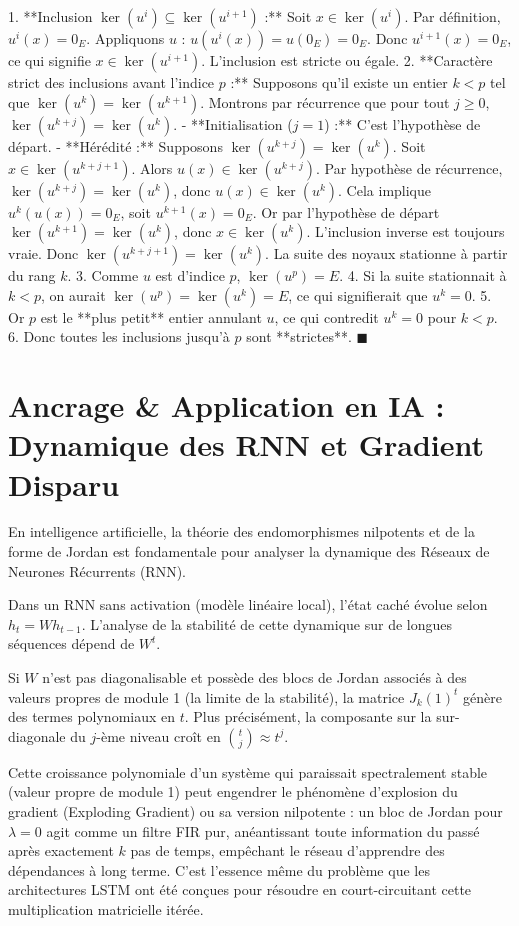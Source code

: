 \documentclass[11pt,a4paper]{article}
\begin{document}
1. **Inclusion $\ker(u^i) \subseteq \ker(u^{i+1})$ :**
   Soit $x \in \ker(u^i)$. Par définition, $u^i(x) = 0_E$.
   Appliquons $u$ : $u(u^i(x)) = u(0_E) = 0_E$.
   Donc $u^{i+1}(x) = 0_E$, ce qui signifie $x \in \ker(u^{i+1})$. L'inclusion est stricte ou égale.
2. **Caractère strict des inclusions avant l'indice $p$ :**
   Supposons qu'il existe un entier $k < p$ tel que $\ker(u^k) = \ker(u^{k+1})$.
   Montrons par récurrence que pour tout $j \ge 0$, $\ker(u^{k+j}) = \ker(u^k)$.
   - **Initialisation ($j=1$) :** C'est l'hypothèse de départ.
   - **Hérédité :** Supposons $\ker(u^{k+j}) = \ker(u^k)$.
     Soit $x \in \ker(u^{k+j+1})$. Alors $u(x) \in \ker(u^{k+j})$.
     Par hypothèse de récurrence, $\ker(u^{k+j}) = \ker(u^k)$, donc $u(x) \in \ker(u^k)$.
     Cela implique $u^k(u(x)) = 0_E$, soit $u^{k+1}(x) = 0_E$.
     Or par l'hypothèse de départ $\ker(u^{k+1}) = \ker(u^k)$, donc $x \in \ker(u^k)$.
     L'inclusion inverse est toujours vraie. Donc $\ker(u^{k+j+1}) = \ker(u^k)$.
   La suite des noyaux stationne à partir du rang $k$.
3. Comme $u$ est d'indice $p$, $\ker(u^p) = E$.
4. Si la suite stationnait à $k < p$, on aurait $\ker(u^p) = \ker(u^k) = E$, ce qui signifierait que $u^k = 0$.
5. Or $p$ est le **plus petit** entier annulant $u$, ce qui contredit $u^k=0$ pour $k < p$.
6. Donc toutes les inclusions jusqu'à $p$ sont **strictes**. $\blacksquare$

\section{Ancrage \& Application en IA : Dynamique des RNN et Gradient Disparu}

En intelligence artificielle, la théorie des endomorphismes nilpotents et de la forme de Jordan est fondamentale pour analyser la dynamique des Réseaux de Neurones Récurrents (RNN).

Dans un RNN sans activation (modèle linéaire local), l'état caché évolue selon $h_t = W h_{t-1}$.
L'analyse de la stabilité de cette dynamique sur de longues séquences dépend de $W^t$.

Si $W$ n'est pas diagonalisable et possède des blocs de Jordan associés à des valeurs propres de module 1 (la limite de la stabilité), la matrice $J_k(1)^t$ génère des termes polynomiaux en $t$. Plus précisément, la composante sur la sur-diagonale du $j$-ème niveau croît en $\binom{t}{j} \approx t^j$.

Cette croissance polynomiale d'un système qui paraissait spectralement stable (valeur propre de module 1) peut engendrer le phénomène d'explosion du gradient (Exploding Gradient) ou sa version nilpotente : un bloc de Jordan pour $\lambda=0$ agit comme un filtre FIR pur, anéantissant toute information du passé après exactement $k$ pas de temps, empêchant le réseau d'apprendre des dépendances à long terme. C'est l'essence même du problème que les architectures LSTM ont été conçues pour résoudre en court-circuitant cette multiplication matricielle itérée.
\end{document}
